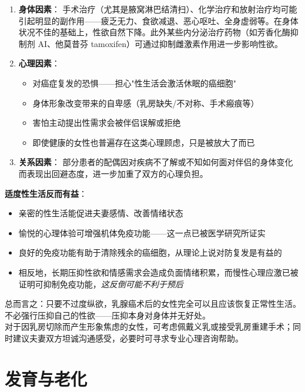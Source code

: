\begin{enumerate}
	\item \textbf{身体因素}：
	手术治疗（尤其是腋窝淋巴结清扫）、化学治疗和放射治疗均可能引起明显的副作用——疲乏无力、食欲减退、恶心呕吐、全身虚弱等。在身体状况不佳的基础上，性欲自然下降。此外某些内分泌治疗药物（如芳香化酶抑制剂 AI、他莫昔芬 tamoxifen）可通过抑制雌激素作用进一步影响性欲。

	\item \textbf{心理因素}：
	\begin{itemize}
		\item 对癌症复发的恐惧——担心"性生活会激活休眠的癌细胞"
		\item 身体形象改变带来的自卑感（乳房缺失/不对称、手术瘢痕等）
		\item 害怕主动提出性需求会被伴侣误解或拒绝
		\item 即使健康的女性也普遍存在这类心理顾虑，只是被放大了而已
	\end{itemize}

	\item \textbf{关系因素}：
	部分患者的配偶因对疾病不了解或不知如何面对伴侣的身体变化而表现出回避态度，进一步加重了双方的心理负担。
\end{enumerate}

\vspace{0.5em}
\noindent\textbf{适度性生活反而有益}：

\begin{itemize}
	\item 亲密的性生活能促进夫妻感情、改善情绪状态
	\item 愉悦的心理体验可增强机体免疫功能——这一点已被医学研究所证实
	\item 良好的免疫功能有助于清除残余的癌细胞，从理论上说对防复发是有益的
	\item 相反地，长期压抑性欲和情感需求会造成负面情绪积累，而慢性心理应激已被证明可抑制免疫功能，\textit{这反倒可能不利于预后}
\end{itemize}

\begin{tcolorbox}[colback=pink!5!white,colframe=red!50!black,title=贴心小叮咛]
总而言之：只要不过度纵欲，乳腺癌术后的女性完全可以且应该恢复正常性生活。不必强行压抑自己的性欲——压抑本身对身体并无好处。\\
对于因乳房切除而产生形象焦虑的女性，可考虑佩戴义乳或接受乳房重建手术；同时建议夫妻双方坦诚沟通感受，必要时可寻求专业心理咨询帮助。
\end{tcolorbox}

\section{发育与老化}

